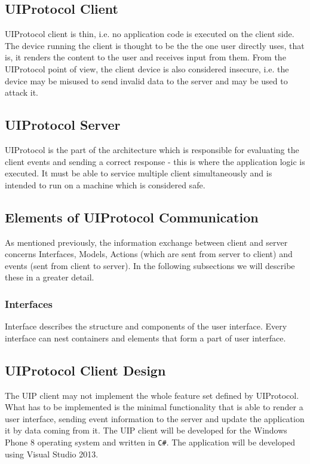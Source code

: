 \subsection{UIProtocol Client}
UIProtocol client is thin, i.e. no application code is executed on the client side. The device running the client is thought to be the the one user directly uses, that is, it renders the content to the user and receives input from them. From the UIProtocol point of view, the client device is also considered insecure, i.e. the device may be misused to send invalid data to the server and may be used to attack it.

\subsection{UIProtocol Server}
UIProtocol is the part of the architecture which is responsible for evaluating the client events and sending a correct response - this is where the application logic is executed. It must be able to service multiple client simultaneously and is intended to run on a machine which is considered safe.


\subsection{Elements of UIProtocol Communication}
As mentioned previously, the information exchange between client and server concerns Interfaces, Models, Actions (which are sent from server to client) and events (sent from client to server). In the following subsections we will describe these in a greater detail.

\subsubsection{Interfaces}
Interface describes the structure and components of the user interface. Every interface can nest containers and elements that form a part of user interface.\\



\newpage
\subsection{UIProtocol Client Design}
The UIP client may not implement the whole feature set defined by UIProtocol. What has to be implemented is the minimal functionality that is able to render a user interface, sending event information to the server and update the application it by data coming from it.
The UIP client will be developed for the Windows Phone 8 operating system and written in \texttt{C\#}. The application will be developed using Visual Studio 2013. 
\endinput